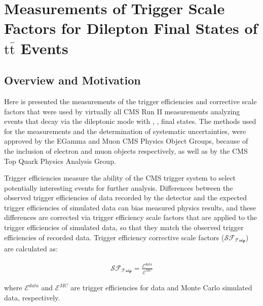 
\chapter{Measurements of Trigger Scale Factors for Dilepton Final States of \ensuremath{\mathrm{t\bar{t}}} Events}

\section{Overview and Motivation}
Here is presented the measurements of the trigger efficiencies and corrective scale factors that were used by virtually all CMS Run II measurements analyzing \ttbar events that decay via the dileptonic mode with \ee, \emu, \mumu final states.  
The methods used for the measurements and the determination of systematic uncertainties, were approved by the EGamma and Muon CMS Physics Object Groups, because of the inclusion of electron and muon objects respectively, as well as by the CMS Top Quark Physics Analysis Group.

Trigger efficiencies measure the ability of the CMS trigger system to select potentially interesting events for further analysis.
Differences between the observed trigger efficiencies of data recorded by the detector and the expected trigger efficiencies of simulated data can bias measured physics results, and these differences are corrected via trigger efficiency scale factors that are applied to the trigger efficiencies of simulated data, so that they match the observed trigger efficiencies of recorded data.
Trigger efficiency corrective scale factors ($\mathcal{SF_{\text{Trig}}}$) are calculated as:
\begin{linenomath*}
\begin{align}
\mathcal{SF_{\text{Trig}}} = \frac{\mathcal{E}^{data}}{\mathcal{E}^{MC}}
\label{SF}
\end{align}
\end{linenomath*}
where $\mathcal{E}^{data}$ and $\mathcal{E}^{MC}$ are trigger efficiencies for data and Monte Carlo simulated data, respectively.


